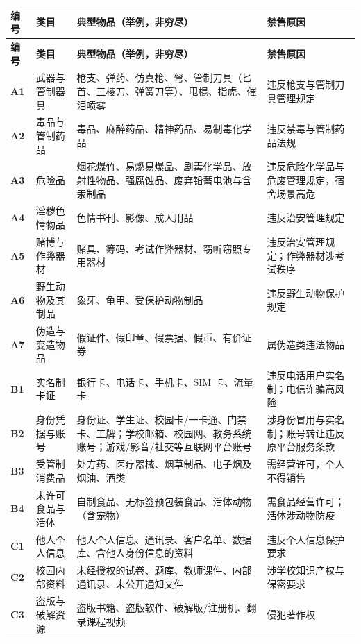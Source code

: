\documentclass[12pt,a4paper]{ctexart}
\begin{document}
{\scriptsize
\begin{longtable}{|p{1.48cm}|p{2.05cm}|p{8.07cm}|p{4.39cm}|}
\hline
\textbf{编号} & \textbf{类目} & \textbf{典型物品（举例，非穷尽）} & \textbf{禁售原因} \\
\hline
\endfirsthead
\hline
\textbf{编号} & \textbf{类目} & \textbf{典型物品（举例，非穷尽）} & \textbf{禁售原因} \\
\hline
\endhead
\hline
\endfoot
\textbf{A1} & 武器与管制器具 & 枪支、弹药、仿真枪、弩、管制刀具（匕首、三棱刀、弹簧刀等）、甩棍、指虎、催泪喷雾 & 违反枪支与管制刀具管理规定 \\
\hline
\textbf{A2} & 毒品与管制药品 & 毒品、麻醉药品、精神药品、易制毒化学品 & 违反禁毒与管制药品法规 \\
\hline
\textbf{A3} & 危险品 & 烟花爆竹、易燃易爆品、剧毒化学品、放射性物品、强腐蚀品、废弃铅蓄电池与含汞制品 & 违反危险化学品与危废管理规定，宿舍场景高危 \\
\hline
\textbf{A4} & 淫秽色情物品 & 色情书刊、影像、成人用品 & 违反治安管理规定 \\
\hline
\textbf{A5} & 赌博与作弊器材 & 赌具、筹码、考试作弊器材、窃听窃照专用器材 & 违反治安管理规定；作弊器材涉考试秩序 \\
\hline
\textbf{A6} & 野生动物及其制品 & 象牙、龟甲、受保护动物制品 & 违反野生动物保护规定 \\
\hline
\textbf{A7} & 伪造与变造物品 & 假证件、假印章、假票据、假币、有价证券 & 属伪造类违法物品 \\
\hline
\textbf{B1} & 实名制卡证 & 银行卡、电话卡、手机卡、SIM 卡、流量卡 & 违反电话用户实名制；电信诈骗高风险 \\
\hline
\textbf{B2} & 身份凭据与账号 & 身份证、学生证、校园卡/一卡通、门禁卡、工牌；学校邮箱、校园网、教务系统账号；游戏/影音/社交等互联网平台账号 & 涉身份冒用与实名制；账号转让违反原平台服务条款 \\
\hline
\textbf{B3} & 受管制消费品 & 处方药、医疗器械、烟草制品、电子烟及烟油、酒类 & 需经营许可，个人不得销售 \\
\hline
\textbf{B4} & 未许可食品与活体 & 自制食品、无标签预包装食品、活体动物（含宠物） & 需食品经营许可；活体涉动物防疫 \\
\hline
\textbf{C1} & 他人个人信息 & 他人个人信息、通讯录、客户名单、数据库、含他人身份信息的资料 & 违反个人信息保护要求 \\
\hline
\textbf{C2} & 校园内部资料 & 未经授权的试卷、题库、教师课件、内部通讯录、未公开通知文件 & 涉学校知识产权与保密要求 \\
\hline
\textbf{C3} & 盗版与破解资源 & 盗版书籍、盗版软件、破解版/注册机、翻录课程视频 & 侵犯著作权 \\

\end{longtable}}
\end{document}
